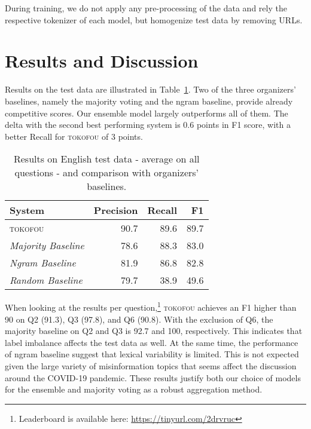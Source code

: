 \documentclass[11pt,a4paper]{article}
\begin{document}
During training, we do not apply any pre-processing of the data and rely the respective tokenizer of each model, but homogenize test data by removing URLs.

\section{Results and Discussion}

Results on the test data are illustrated in Table~\ref{tab:score_test}. Two of the three organizers' baselines, namely the majority voting and the ngram baseline, provide already competitive scores. Our ensemble model largely outperforms all of them. The delta with the second best performing system is 0.6 points in F1 score, with a better Recall for \textsc{tokofou} of 3 points.

\begin{table}[!th]
     \centering
     \small
\begin{tabularx}{0.95\textwidth}{lrrr}
 \textbf{System} & \textbf{Precision} & \textbf{Recall} & \textbf{F1}  \\
  \toprule
 \textsc{tokofou} & 90.7 & 89.6 & 89.7 \\ 
 \emph{Majority Baseline} & 78.6 & 88.3 & 83.0 \\ 
 \emph{Ngram Baseline} & 81.9 & 86.8  & 82.8  \\
 \emph{Random Baseline} & 79.7 & 38.9  & 49.6  \\
 \bottomrule
 \end{tabularx}
 \caption{Results on English test data - average on all questions - and comparison with organizers' baselines.}
     \label{tab:score_test}
 \end{table}

When looking at the results per question,\footnote{Leaderboard is available here: \url{https://tinyurl.com/2drvruc}} \textsc{tokofou} achieves an F1 higher than 90 on Q2 (91.3), Q3 (97.8), and Q6 (90.8). With the exclusion of Q6, the majority baseline on Q2 and Q3 is 92.7 and 100, respectively. This indicates that label imbalance affects the test data as well. At the same time, the performance of ngram baseline suggest that lexical variability is limited. This is not expected given the large variety of misinformation topics that seems affect the discussion around the COVID-19 pandemic. 
These results justify both our choice of models for the ensemble and majority voting as a robust aggregation method.
\end{document}
